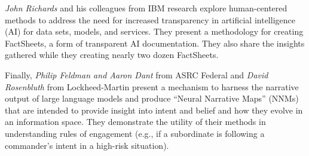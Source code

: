\documentclass[11pt]{article}
\begin{document}
\textit{John Richards} and his colleagues from IBM research explore  human-centered methods to address the need for increased transparency in artificial intelligence (AI) for data sets, models, and services. They present a methodology for creating FactSheets, a form of transparent AI documentation. They also share the insights gathered while they creating nearly two dozen FactSheets.    

Finally, \textit{Philip Feldman and Aaron Dant} from ASRC Federal and \textit{David Rosenbluth} from Lockheed-Martin present a mechanism to harness the narrative output of large language models and produce ``Neural Narrative Maps'' (NNMs) that are intended to provide insight into intent and belief and how they evolve in an information space. They demonstrate the utility of their methods in understanding rules of engagement (e.g., if a subordinate is following a commander's intent in a high-risk situation).  

\end{document}
